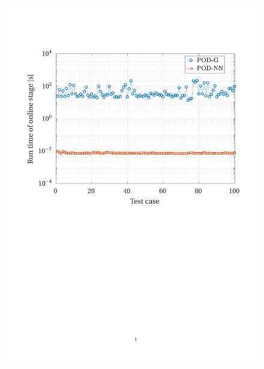 \documentclass[12pt, a4paper, twoside, openright]{report}
\numberwithin{equation}{chapter}
\theoremstyle{theorem}
\theoremstyle{definition}
\theoremstyle{remark}
\theoremstyle{proposition}
\numberwithin{figure}{chapter}
\begin{document}
	\begin{figure}[H]
		\center
		\includegraphics[scale = 0.75, trim = {1.5cm 12cm 1cm 3.5cm}, clip]{dc_200_time}
	\end{figure}
	
\end{document}
